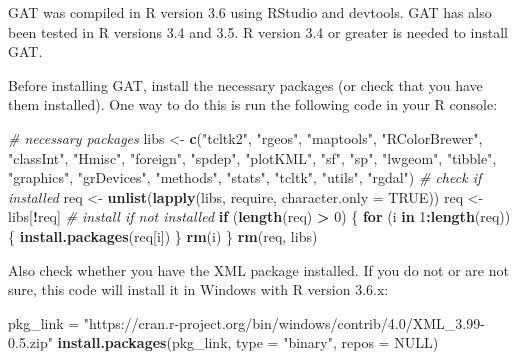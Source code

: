 \documentclass[
]{article}
\newenvironment{Shaded}{\begin{snugshade}}{\end{snugshade}}
\newcommand{\CommentTok}[1]{\textcolor[rgb]{0.56,0.35,0.01}{\textit{#1}}}
\newcommand{\ControlFlowTok}[1]{\textcolor[rgb]{0.13,0.29,0.53}{\textbf{#1}}}
\newcommand{\DataTypeTok}[1]{\textcolor[rgb]{0.13,0.29,0.53}{#1}}
\newcommand{\DecValTok}[1]{\textcolor[rgb]{0.00,0.00,0.81}{#1}}
\newcommand{\KeywordTok}[1]{\textcolor[rgb]{0.13,0.29,0.53}{\textbf{#1}}}
\newcommand{\NormalTok}[1]{#1}
\newcommand{\OperatorTok}[1]{\textcolor[rgb]{0.81,0.36,0.00}{\textbf{#1}}}
\newcommand{\OtherTok}[1]{\textcolor[rgb]{0.56,0.35,0.01}{#1}}
\newcommand{\StringTok}[1]{\textcolor[rgb]{0.31,0.60,0.02}{#1}}
\begin{document}
GAT was compiled in R version 3.6 using RStudio and devtools. GAT has
also been tested in R versions 3.4 and 3.5. R version 3.4 or greater is
needed to install GAT.

Before installing GAT, install the necessary packages (or check that you
have them installed). One way to do this is run the following code in
your R console:

\begin{Shaded}
\begin{Highlighting}[]
\CommentTok{# necessary packages}
\NormalTok{libs <-}\StringTok{ }\KeywordTok{c}\NormalTok{(}\StringTok{"tcltk2"}\NormalTok{, }\StringTok{"rgeos"}\NormalTok{, }\StringTok{"maptools"}\NormalTok{, }\StringTok{"RColorBrewer"}\NormalTok{, }\StringTok{"classInt"}\NormalTok{, }\StringTok{"Hmisc"}\NormalTok{,}
          \StringTok{"foreign"}\NormalTok{, }\StringTok{"spdep"}\NormalTok{, }\StringTok{"plotKML"}\NormalTok{, }\StringTok{"sf"}\NormalTok{, }\StringTok{"sp"}\NormalTok{, }\StringTok{"lwgeom"}\NormalTok{, }\StringTok{"tibble"}\NormalTok{,}
          \StringTok{"graphics"}\NormalTok{, }\StringTok{"grDevices"}\NormalTok{, }\StringTok{"methods"}\NormalTok{, }\StringTok{"stats"}\NormalTok{, }\StringTok{"tcltk"}\NormalTok{, }\StringTok{"utils"}\NormalTok{, }
          \StringTok{"rgdal"}\NormalTok{)}
\CommentTok{# check if installed}
\NormalTok{req <-}\StringTok{ }\KeywordTok{unlist}\NormalTok{(}\KeywordTok{lapply}\NormalTok{(libs, require, }\DataTypeTok{character.only =} \OtherTok{TRUE}\NormalTok{))}
\NormalTok{req <-}\StringTok{ }\NormalTok{libs[}\OperatorTok{!}\NormalTok{req]}
\CommentTok{# install if not installed}
\ControlFlowTok{if}\NormalTok{ (}\KeywordTok{length}\NormalTok{(req) }\OperatorTok{>}\StringTok{ }\DecValTok{0}\NormalTok{) \{}
  \ControlFlowTok{for}\NormalTok{ (i }\ControlFlowTok{in} \DecValTok{1}\OperatorTok{:}\KeywordTok{length}\NormalTok{(req)) \{}
    \KeywordTok{install.packages}\NormalTok{(req[i])}
\NormalTok{  \}}
  \KeywordTok{rm}\NormalTok{(i)}
\NormalTok{\}}
\KeywordTok{rm}\NormalTok{(req, libs)}
\end{Highlighting}
\end{Shaded}

Also check whether you have the XML package installed. If you do not or
are not sure, this code will install it in Windows with R version 3.6.x:

\begin{Shaded}
\begin{Highlighting}[]
\NormalTok{pkg_link =}\StringTok{ "https://cran.r-project.org/bin/windows/contrib/4.0/XML_3.99-0.5.zip"}
\KeywordTok{install.packages}\NormalTok{(pkg_link, }\DataTypeTok{type =} \StringTok{"binary"}\NormalTok{, }\DataTypeTok{repos =} \OtherTok{NULL}\NormalTok{)}
\end{Highlighting}
\end{Shaded}
\end{document}

